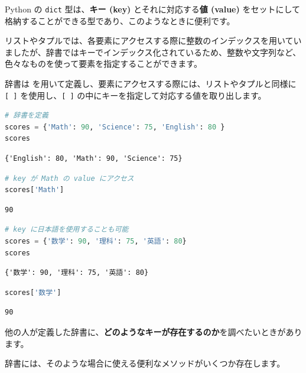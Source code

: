Python の \texttt{dict} 型は、\textbf{キー (key)} とそれに対応する\textbf{値 (value)} をセットにして格納することができる型であり、このようなときに便利です。


リストやタプルでは、各要素にアクセスする際に整数のインデックスを用いていましたが、辞書ではキーでインデックス化されているため、整数や文字列など、色々なものを使って要素を指定することができます。


辞書は \texttt{{}} を用いて定義し、要素にアクセスする際には、リストやタプルと同様に \texttt{[ ]} を使用し、\texttt{[ ]} の中にキーを指定して対応する値を取り出します。


\begin{lstlisting}[style=codecell,language=Python]
# 辞書を定義
scores = {'Math': 90, 'Science': 75, 'English': 80 }
scores
\end{lstlisting}

\begin{lstlisting}[style=outputcell]
{'English': 80, 'Math': 90, 'Science': 75}
\end{lstlisting}

\begin{lstlisting}[style=codecell,language=Python]
# key が Math の value にアクセス
scores['Math']
\end{lstlisting}

\begin{lstlisting}[style=outputcell]
90
\end{lstlisting}

\begin{lstlisting}[style=codecell,language=Python]
# key に日本語を使用することも可能
scores = {'数学': 90, '理科': 75, '英語': 80}
scores
\end{lstlisting}

\begin{lstlisting}[style=outputcell]
{'数学': 90, '理科': 75, '英語': 80}
\end{lstlisting}

\begin{lstlisting}[style=codecell,language=Python]
scores['数学']
\end{lstlisting}

\begin{lstlisting}[style=outputcell]
90
\end{lstlisting}

他の人が定義した辞書に、\textbf{どのようなキーが存在するのか}を調べたいときがあります。

辞書には、そのような場合に使える便利なメソッドがいくつか存在します。


